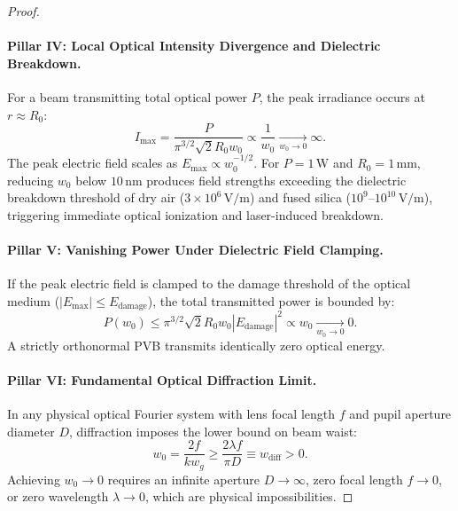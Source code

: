 \documentclass[11pt,a4paper]{article}
\begin{document}
\begin{proof}
\paragraph{Pillar IV: Local Optical Intensity Divergence and Dielectric Breakdown.}
For a beam transmitting total optical power $P$, the peak irradiance occurs at $r \approx R_0$:
\begin{equation}
I_{\max} = \frac{P}{\pi^{3/2} \sqrt{2} R_0 w_0} \propto \frac{1}{w_0} \xrightarrow[w_0 \to 0]{} \infty.
\end{equation}
The peak electric field scales as $E_{\max} \propto w_0^{-1/2}$. For $P = 1\,\text{W}$ and $R_0 = 1\,\text{mm}$, reducing $w_0$ below $10\,\text{nm}$ produces field strengths exceeding the dielectric breakdown threshold of dry air ($3 \times 10^6\,\text{V/m}$) and fused silica ($10^9\text{--}10^{10}\,\text{V/m}$), triggering immediate optical ionization and laser-induced breakdown.

\paragraph{Pillar V: Vanishing Power Under Dielectric Field Clamping.}
If the peak electric field is clamped to the damage threshold of the optical medium ($|E_{\max}| \le E_{\text{damage}}$), the total transmitted power is bounded by:
\begin{equation}
P(w_0) \le \pi^{3/2} \sqrt{2} R_0 w_0 |E_{\text{damage}}|^2 \propto w_0 \xrightarrow[w_0 \to 0]{} 0.
\end{equation}
A strictly orthonormal PVB transmits identically zero optical energy.

\paragraph{Pillar VI: Fundamental Optical Diffraction Limit.}
In any physical optical Fourier system with lens focal length $f$ and pupil aperture diameter $D$, diffraction imposes the lower bound on beam waist:
\begin{equation}
w_0 = \frac{2 f}{k w_g} \ge \frac{2 \lambda f}{\pi D} \equiv w_{\text{diff}} > 0.
\end{equation}
Achieving $w_0 \to 0$ requires an infinite aperture $D \to \infty$, zero focal length $f \to 0$, or zero wavelength $\lambda \to 0$, which are physical impossibilities.


\end{proof}
\end{document}
